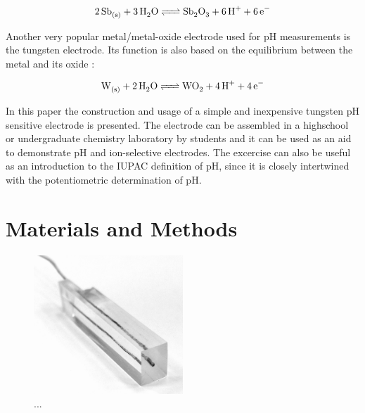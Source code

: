\documentclass[manuscript=article, journal=jceda8]{achemso}
\begin{document}
\begin{equation}
        \ce{2Sb_{(s)} + 3H_2O <=> Sb_2O_3 + 6H^+ + 6e^-}
\end{equation}

Another very popular metal/metal-oxide electrode used for pH measurements is the tungsten electrode. Its function is also based on the equilibrium between the metal and its oxide \cite{kriksunov1994tungsten}:

\begin{equation}
        \ce{W_{(s)} + 2H_2O <=> WO_2 + 4H^+ + 4e^-}
\end{equation}

In this paper the construction and usage of a simple and inexpensive tungsten pH sensitive electrode is presented. The electrode can be assembled in a highschool or undergraduate chemistry laboratory by students and it can be used as an aid to demonstrate pH and ion-selective electrodes. The excercise can also be useful as an introduction to the IUPAC definition of pH, since it is closely intertwined with the potentiometric determination of pH.


\section{Materials and Methods}

\begin{figure}[!h]
\centering
\includegraphics[width=0.5\textwidth]{img/plexi.jpg}
\caption{...}
\label{fig:plexi}
\end{figure}
\end{document}
